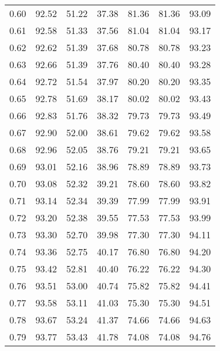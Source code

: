 \begin{tabular}{|c|c|c|c|c|c|c|}
      0.60 &     92.52 &     51.22 &      37.38 &   81.36 &      81.36 &         93.09 \\
      0.61 &     92.58 &     51.33 &      37.56 &   81.04 &      81.04 &         93.17 \\
      0.62 &     92.62 &     51.39 &      37.68 &   80.78 &      80.78 &         93.23 \\
      0.63 &     92.66 &     51.39 &      37.76 &   80.40 &      80.40 &         93.28 \\
      0.64 &     92.72 &     51.54 &      37.97 &   80.20 &      80.20 &         93.35 \\
      0.65 &     92.78 &     51.69 &      38.17 &   80.02 &      80.02 &         93.43 \\
      0.66 &     92.83 &     51.76 &      38.32 &   79.73 &      79.73 &         93.49 \\
      0.67 &     92.90 &     52.00 &      38.61 &   79.62 &      79.62 &         93.58 \\
      0.68 &     92.96 &     52.05 &      38.76 &   79.21 &      79.21 &         93.65 \\
      0.69 &     93.01 &     52.16 &      38.96 &   78.89 &      78.89 &         93.73 \\
      0.70 &     93.08 &     52.32 &      39.21 &   78.60 &      78.60 &         93.82 \\
      0.71 &     93.14 &     52.34 &      39.39 &   77.99 &      77.99 &         93.91 \\
      0.72 &     93.20 &     52.38 &      39.55 &   77.53 &      77.53 &         93.99 \\
      0.73 &     93.30 &     52.70 &      39.98 &   77.30 &      77.30 &         94.11 \\
      0.74 &     93.36 &     52.75 &      40.17 &   76.80 &      76.80 &         94.20 \\
      0.75 &     93.42 &     52.81 &      40.40 &   76.22 &      76.22 &         94.30 \\
      0.76 &     93.51 &     53.00 &      40.74 &   75.82 &      75.82 &         94.41 \\
      0.77 &     93.58 &     53.11 &      41.03 &   75.30 &      75.30 &         94.51 \\
      0.78 &     93.67 &     53.24 &      41.37 &   74.66 &      74.66 &         94.63 \\
      0.79 &     93.77 &     53.43 &      41.78 &   74.08 &      74.08 &         94.76 \\

\end{tabular}
